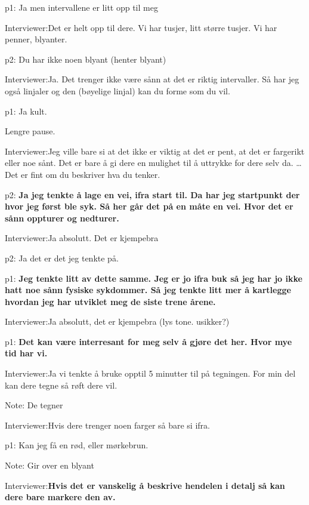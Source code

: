 \documentclass[../../MasterThesis.tex]{subfiles}
\begin{document}
\textcolor{myGreen} {p1:} Ja men intervallene er litt opp til meg

\textcolor{myBlue} {Interviewer:}Det er helt opp til dere. Vi har tusjer, litt større tusjer. Vi har penner, blyanter.

\textcolor{myYellow} {p2:} Du har ikke noen blyant (henter blyant)

\textcolor{myBlue} {Interviewer:}Ja. Det trenger ikke være sånn at det er riktig intervaller. Så har jeg også linjaler og den (bøyelige linjal) kan du forme som du vil.

\textcolor{myGreen} {p1:} Ja kult.

Lengre pause. 

\textcolor{myBlue} {Interviewer:}Jeg ville bare si at det ikke er viktig at det er pent, at det er fargerikt eller noe sånt. Det er bare å gi dere en mulighet til å uttrykke for dere selv da. \dots Det er fint om du beskriver hva du tenker.

\textcolor{myYellow} {p2:} \textbf{Ja jeg tenkte å lage en vei, ifra start til. Da har jeg startpunkt der hvor jeg først ble syk. Så her går det på en måte en vei. Hvor det er sånn oppturer og nedturer.}

\textcolor{myBlue} {Interviewer:}Ja absolutt. Det er kjempebra

\textcolor{myYellow} {p2:} Ja det er det jeg tenkte på.

\textcolor{myGreen} {p1:} \textbf{Jeg tenkte litt av dette samme. Jeg er jo ifra buk så jeg har jo ikke hatt noe sånn fysiske sykdommer. Så jeg tenkte litt mer å kartlegge hvordan jeg har utviklet meg de siste trene årene.}

\textcolor{myBlue} {Interviewer:}Ja absolutt, det er kjempebra (lys tone. usikker?)

\textcolor{myGreen} {p1:} \textbf{Det kan være interresant for meg selv å gjøre det her. Hvor mye tid har vi. }

\textcolor{myBlue} {Interviewer:}Ja vi tenkte å bruke opptil 5 minutter til på tegningen. For min del kan dere tegne så røft dere vil. 


\textcolor{myGrey}{Note:} De tegner

\textcolor{myBlue} {Interviewer:}Hvis dere trenger noen farger så bare si ifra.

\textcolor{myGreen} {p1:} Kan jeg få en rød, eller mørkebrun.

\textcolor{myGrey}{Note:} Gir over en blyant

\textcolor{myBlue} {Interviewer:}\textbf{Hvis det er vanskelig å beskrive hendelen i detalj så kan dere bare markere den av.} 
\end{document}
